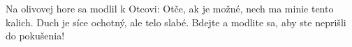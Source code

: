 Na olivovej hore sa modlil k Otcovi:
Otče, ak je možné, nech ma minie tento kalich.
\versseparator
Duch je síce ochotný, ale telo slabé.
\versseparator
Bdejte a modlite sa, aby ste neprišli do pokušenia!
